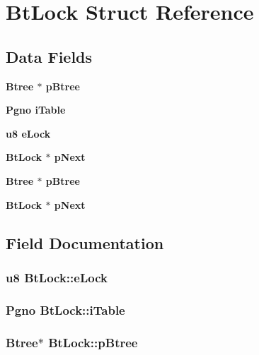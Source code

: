 \section{Bt\-Lock Struct Reference}
\label{structBtLock}
\subsection*{Data Fields}
\begin{CompactItemize}
\item 
\bf{Btree} $\ast$ \bf{p\-Btree}
\item 
\bf{Pgno} \bf{i\-Table}
\item 
\bf{u8} \bf{e\-Lock}
\item 
\bf{Bt\-Lock} $\ast$ \bf{p\-Next}
\item 
\bf{Btree} $\ast$ \bf{p\-Btree}
\item 
\bf{Bt\-Lock} $\ast$ \bf{p\-Next}
\end{CompactItemize}


\subsection{Field Documentation}
\subsubsection{\setlength{\rightskip}{0pt plus 5cm}\bf{u8} \bf{Bt\-Lock::e\-Lock}}\label{structBtLock_7478faea2bb4b8d73def34c336a3d10b}


\subsubsection{\setlength{\rightskip}{0pt plus 5cm}\bf{Pgno} \bf{Bt\-Lock::i\-Table}}\label{structBtLock_e025ac75137176280cce8ce2fb53289c}


\subsubsection{\setlength{\rightskip}{0pt plus 5cm}\bf{Btree}$\ast$ \bf{Bt\-Lock::p\-Btree}}\label{structBtLock_da80748a0aa7668b32b18302ea96cd2a}


